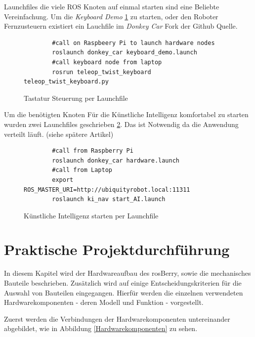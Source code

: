 \documentclass[conference]{IEEEtran}
\begin{document}
	Launchfiles die viele ROS Knoten auf einmal starten sind eine Beliebte 
	Vereinfachung. Um die \textit{Keyboard Demo}  \ref{demo} zu starten, oder 
	den Roboter Fernzusteuern existiert ein Lauchfile im \textit{Donkey Car} 
	Fork der Github Quelle.
	\begin{figure}
		\centering
		\begin{verbatim}
		#call on Raspbeery Pi to launch hardware nodes
		roslaunch donkey_car keyboard_demo.launch
		#call keyboard node from laptop 
		rosrun teleop_twist_keyboard teleop_twist_keyboard.py
		\end{verbatim}
		\label{demo}
		\caption{Tastatur Steuerung per Launchfile }
	\end{figure}
	
	Um die benötigten Knoten Für die Künstliche Intelligenz komfortabel zu 
	starten wurden zwei Launchfiles geschrieben \ref{KI-launch}.  Das ist 
	Notwendig da die Anwendung verteilt läuft. (siehe spätere Artikel)
	
	\begin{figure}
		\centering
		\begin{verbatim}
		#call from Raspberry Pi
		roslaunch donkey_car hardware.launch
		#call from Laptop
		export ROS_MASTER_URI=http://ubiquityrobot.local:11311
		roslaunch ki_nav start_AI.launch
		\end{verbatim}
		\label{KI-launch}
		\caption{Künstliche Intelligenz starten per Launchfile }
	\end{figure}
	
	\section{Praktische Projektdurchführung}
	
	
	In diesem Kapitel wird der Hardwareaufbau des rosBerry, sowie die 
	mechanisches Bauteile beschrieben. Zusätzlich wird auf einige 
	Entscheidungskriterien für die Auswahl von Bauteilen eingegangen. 
	Hierfür werden die einzelnen verwendeten Hardwarekomponenten - deren Modell und Funktion - vorgestellt. 
	
	Zuerst werden die Verbindungen der Hardwarekomponenten untereinander abgebildet, wie in Abbildung \ref{Hardwarekomponenten} zu sehen.
\end{document}
